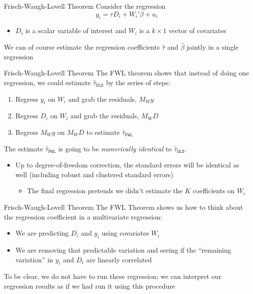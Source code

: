 \documentclass[aspectratio=169,t,11pt,table]{beamer}
\begin{document}
\begin{frame}{Frisch-Waugh-Lovell Theorem}
  Consider the regression
  $$
    y_i = \tau D_i + W_i' \beta + u_i
  $$
  \begin{itemize}
    \item $D_i$ is a scalar variable of interest and $W_i$ is a $k \times 1$ vector of covariates
  \end{itemize}

  \bigskip
  We can of course estimate the regression coefficients $\hat{\tau}$ and $\hat{\beta}$ jointly in a single regression
\end{frame}

\begin{frame}{Frisch-Waugh-Lovell Theorem}
  The \alert{FWL theorem} shows that instead of doing one regression, we could estimate $\hat{\tau}_{\texttt{OLS}}$ by the series of steps:
  \begin{enumerate}
    \item Regress $y_i$ on $W_i$ and grab the residuals, $M_W y$
    \item Regress $D_i$ on $W_i$ and grab the residuals, $M_W D$
    \item Regress $M_W y$ on $M_W D$ to estimate $\hat{\tau}_{\texttt{FWL}}$
  \end{enumerate}

  \bigskip
  \pause
  The estimate $\hat{\tau}_{\texttt{FWL}}$ is going to be \emph{numerically identical} to $\hat{\tau}_{\texttt{OLS}}$.
  \begin{itemize}
    \item Up to degree-of-freedom correction, the standard errors will be identical as well (including robust and clustered standard errors)
    \begin{itemize}
      \item The final regression pretends we didn't estimate the $K$ coefficients on $W_i$
    \end{itemize}
  \end{itemize}
\end{frame}

\begin{frame}{Frisch-Waugh-Lovell Theorem}
  The FWL Theorem shows us how to think about the regression coefficient in a multivariate regression:
  \begin{itemize}
    \item We are predicting $D_i$ and $y_i$ using covariates $W_i$
    \item We are removing that predictable variation and seeing if the ``remaining variation'' in $y_i$ and $D_i$ are linearly correlated
  \end{itemize}

  \pause
  \bigskip
  To be clear, we do not have to run these regression; we can interpret our regression results as if we had run it using this procedure
\end{frame}
\end{document}
